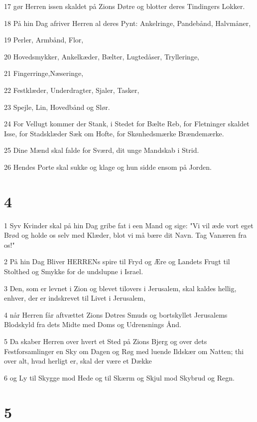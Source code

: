 \par 17 gør Herren issen skaldet på Zions Døtre og blotter deres Tindingers Lokker.
\par 18 På hin Dag afriver Herren al deres Pynt: Ankelringe, Pandebånd, Halvmåner,
\par 19 Perler, Armbånd, Flor,
\par 20 Hovedsmykker, Ankelkæder, Bælter, Lugtedåser, Trylleringe,
\par 21 Fingerringe,Næseringe,
\par 22 Festklæder, Underdragter, Sjaler, Tasker,
\par 23 Spejle, Lin, Hovedbånd og Slør.
\par 24 For Vellugt kommer der Stank, i Stedet for Bælte Reb, for Fletninger skaldet Isse, for Stadsklæder Sæk om Hofte, for Skønhedsmærke Brændemærke.
\par 25 Dine Mænd skal falde for Sværd, dit unge Mandskab i Strid.
\par 26 Hendes Porte skal sukke og klage og hun sidde ensom på Jorden.

\chapter{4}

\par 1 Syv Kvinder skal på hin Dag gribe fat i een Mand og sige: "Vi vil æde vort eget Brød og holde os selv med Klæder, blot vi må bære dit Navn. Tag Vanæren fra os!"
\par 2 På hin Dag Bliver HERRENs spire til Fryd og Ære og Landets Frugt til Stolthed og Smykke for de undslupne i Israel.
\par 3 Den, som er levnet i Zion og blevet tilovers i Jerusalem, skal kaldes hellig, enhver, der er indskrevet til Livet i Jerusalem,
\par 4 når Herren får aftvættet Zions Døtres Smuds og bortskyllet Jerusalems Blodskyld fra dets Midte med Doms og Udrensnings Ånd.
\par 5 Da skaber Herren over hvert et Sted på Zions Bjerg og over dets Festforsamlinger en Sky om Dagen og Røg med luende Ildskær om Natten; thi over alt, hvad herligt er, skal der være et Dække
\par 6 og Ly til Skygge mod Hede og til Skærm og Skjul mod Skybrud og Regn.

\chapter{5}

